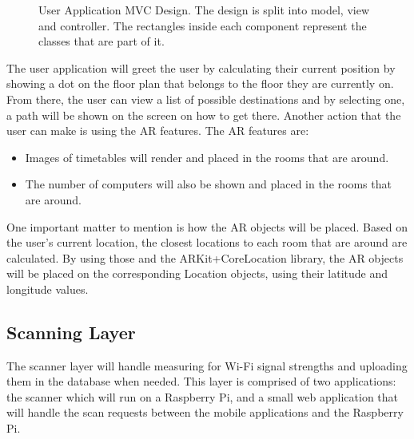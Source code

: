 \begin{figure}[H]
    \centering
    \centering
    \caption{User Application MVC Design. The design is split into model, view and controller. The rectangles inside each component represent the classes that are part of it.}
    \label{fig:user-mvc}
\end{figure}

The user application will greet the user by calculating their current position by showing a dot on the floor plan that belongs to the floor they are currently on. From there, the user can view a list of possible destinations and by selecting one, a path will be shown on the screen on how to get there. Another action that the user can make is using the AR features. The AR features are:
\begin{itemize}
    \item Images of timetables will render and placed in the rooms that are around.
    \item The number of computers will also be shown and placed in the rooms that are around.
\end{itemize}
One important matter to mention is how the AR objects will be placed. Based on the user's current location, the closest locations to each room that are around are calculated. By using those and the ARKit+CoreLocation library, the AR objects will be placed on the corresponding Location objects, using their latitude and longitude values.

\subsection{Scanning Layer}
The scanner layer will handle measuring for Wi-Fi signal strengths and uploading them in the database when needed. This layer is comprised of two applications: the scanner which will run on a Raspberry Pi, and a small web application that will handle the scan requests between the mobile applications and the Raspberry Pi.


